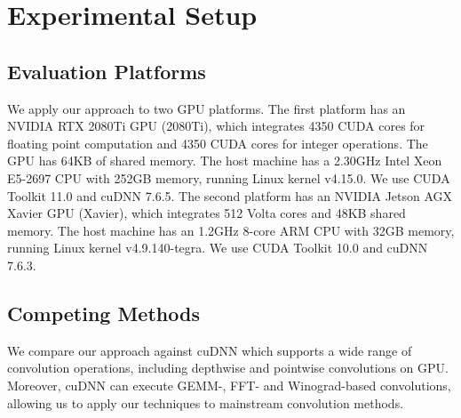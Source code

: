 

\section{Experimental Setup}

\subsection{Evaluation Platforms} We apply our approach to two GPU platforms.
The first platform has an NVIDIA RTX 2080Ti GPU (2080Ti), which integrates 4350 CUDA cores for floating point computation and 4350 CUDA
cores for integer operations. The GPU has 64KB of shared memory. The host machine has a 2.30GHz Intel Xeon E5-2697 CPU with 252GB memory,
running Linux kernel v4.15.0. We use CUDA Toolkit 11.0 and cuDNN 7.6.5. The second platform has an NVIDIA Jetson AGX Xavier GPU (Xavier),
which integrates 512 Volta cores and 48KB shared memory. The host machine has an 1.2GHz 8-core ARM CPU with 32GB memory, running Linux
kernel v4.9.140-tegra. We use CUDA Toolkit 10.0 and cuDNN 7.6.3.


\subsection{Competing Methods} We compare our approach against cuDNN \FIXME{\cite{}} which supports a wide range of convolution operations,
 including depthwise and pointwise convolutions on GPU.  Moreover, cuDNN can execute GEMM-, FFT- and Winograd-based convolutions, allowing
 us to apply our techniques to mainstream convolution methods.


%
%


